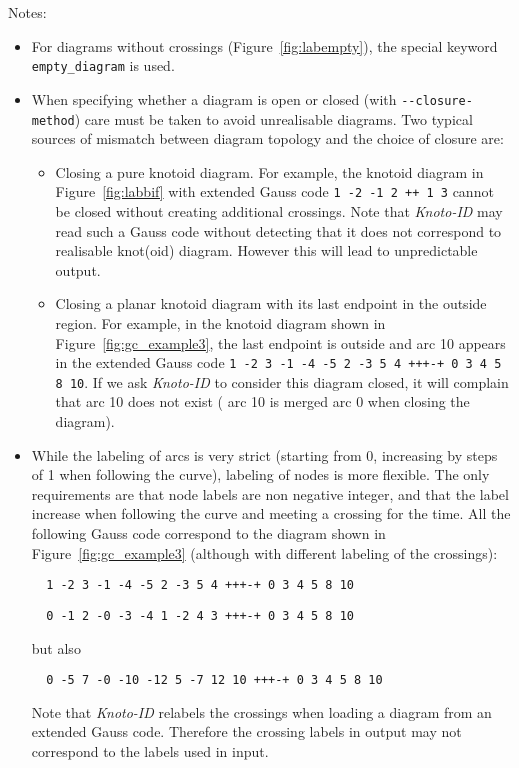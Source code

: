 Notes:
\begin{itemize}
\item For diagrams without crossings (Figure~\ref{fig:labempty}), the special keyword \lstinline{empty_diagram} is used.
\item When specifying whether a diagram is open or closed (with \lstinline{--closure-method}) care must be taken to avoid unrealisable diagrams. Two typical sources of mismatch between diagram topology and the choice of closure are:
\begin{itemize}
\item Closing a pure knotoid diagram. For example, the knotoid diagram in Figure~\ref{fig:labbif} with extended Gauss code \lstinline{1 -2 -1 2 ++ 1 3} cannot be closed without creating additional crossings. Note that {\it Knoto-ID} may read such a Gauss code without detecting that it does not correspond to realisable knot(oid) diagram. However this will lead to unpredictable output.
\item  Closing a planar knotoid diagram with its last endpoint in the outside region. For example, in the knotoid diagram shown in Figure~\ref{fig:gc_example3}, the last endpoint is outside and arc 10 appears in the extended Gauss code \lstinline{1 -2 3 -1 -4 -5 2 -3 5 4 +++-+ 0 3 4 5 8 10}. If we ask {\it Knoto-ID} to consider this diagram closed, it will complain that arc 10 does not exist ( arc 10 is merged arc 0 when closing the diagram).
\end{itemize}
\item While the labeling of arcs is very strict (starting from 0, increasing by steps of 1 when following the curve), labeling of nodes is more flexible. The only requirements are that node labels are non negative integer, and that the label increase when following the curve and meeting a crossing for the time.
All the following Gauss code correspond to the diagram shown in Figure~\ref{fig:gc_example3} (although with different labeling of the crossings):
\begin{lstlisting}
  1 -2 3 -1 -4 -5 2 -3 5 4 +++-+ 0 3 4 5 8 10
\end{lstlisting}
\begin{lstlisting}
  0 -1 2 -0 -3 -4 1 -2 4 3 +++-+ 0 3 4 5 8 10
\end{lstlisting}
but also
\begin{lstlisting}
  0 -5 7 -0 -10 -12 5 -7 12 10 +++-+ 0 3 4 5 8 10
\end{lstlisting}
Note that {\it Knoto-ID} relabels the crossings when loading a diagram from an extended Gauss code. Therefore the crossing labels in output may not correspond to the labels used in input. 

\end{itemize}
